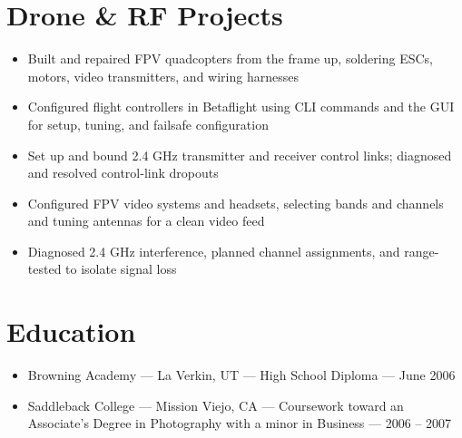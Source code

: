 \documentclass[letterpaper,10.5pt]{article}
\begin{document}
\section*{Drone \& RF Projects}
\begin{itemize}
  \item Built and repaired FPV quadcopters from the frame up, soldering ESCs, motors, video
        transmitters, and wiring harnesses
  \item Configured flight controllers in Betaflight using CLI commands and the GUI for setup,
        tuning, and failsafe configuration
  \item Set up and bound 2.4 GHz transmitter and receiver control links; diagnosed and resolved
        control-link dropouts
  \item Configured FPV video systems and headsets, selecting bands and channels and tuning antennas
        for a clean video feed
  \item Diagnosed 2.4 GHz interference, planned channel assignments, and range-tested to isolate
        signal loss
\end{itemize}

\section*{Education}
\begin{itemize}[label={}]
  \item Browning Academy --- La Verkin, UT --- High School Diploma --- June 2006
  \item Saddleback College --- Mission Viejo, CA --- Coursework toward an Associate's Degree in
        Photography with a minor in Business --- 2006 -- 2007
\end{itemize}
\end{document}
